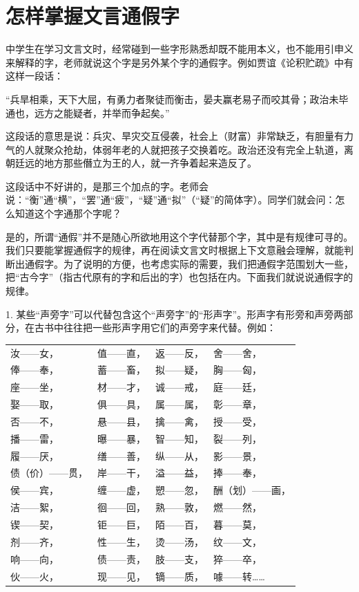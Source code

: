 \section{怎样掌握文言通假字}

中学生在学习文言文时，经常碰到一些字形熟悉却既不能用本义，也不能用引申义来解释的字，老师就说这个字是另外某个字的通假字。例如贾谊《论积贮疏》中有这样一段话：

“兵旱相乘，天下大屈，有勇力者聚徒而衡击，晏夫赢老易子而咬其骨；政治未毕通也，远方之能疑者，并举而争起矣。”

这段话的意思是说：兵灾、旱灾交互侵袭，社会上（财富）非常缺乏，有胆量有力气的人就聚众抢劫，体弱年老的人就把孩子交换着吃。政治还没有完全上轨道，离朝廷远的地方那些僭立为王的人，就一齐争着起来造反了。

这段话中不好讲的，是那三个加点的字。老师会说：“衡”通“横”，“罢”通“疲”，“疑”通“拟”（“疑”的简体字）。同学们就会问：怎么知道这个字通那个字呢？

是的，所谓“通假”并不是随心所欲地用这个字代替那个字，其中是有规律可寻的。我们只要能掌握通假字的规律，再在阅读文言文时根据上下文意融会理解，就能判断出通假字。为了说明的方便，也考虑实际的需要，我们把通假字范围划大一些，把“古今字”（指古代原有的字和后出的字）也包括在内。下面我们就说说通假字的规律。

1. 某些“声旁字”可以代替包含这个“声旁字”的“形声字”。形声字有形旁和声旁两部分，在古书中往往把一些形声字用它们的声旁字来代替。例如：

\noindent
\begin{tabular}{llll}
	汝——女， & 值——直， & 返——反， & 舍——舍，\\
	俸——奉， & 蓄——畜， & 拟——疑， & 胸——匈，\\
	座——坐， & 材——才， & 诚——戒， & 庭——廷，\\
	娶——取， & 俱——具， & 属——属， & 彰——章，\\
	否——不， & 悬——县， & 擒——禽， & 授——受，\\
	播——雷， & 曝——暴， & 智——知， & 裂——列，\\
	履——厌， & 缮——善， & 纵——从， & 影——景，\\
	债（价）——贯， & 岸——干， & 溢——益，& 捧——奉，\\
	侯——宾， & 缠——虚， & 愬——忽， & 酬（划）——画，\\
	洁——絮， & 徊——回， & 熟——敦，& 燃——然，\\
	锲——契， & 钜——巨， & 陌——百，& 暮——莫，\\
	剂——齐， & 性——生， & 烫——汤，& 纹——文，\\
	响——向， & 债——责， & 肢——支，& 猝——卒，\\
	伙——火， & 现——见， & 镝——质，& 噱——转……\\
\end{tabular}

